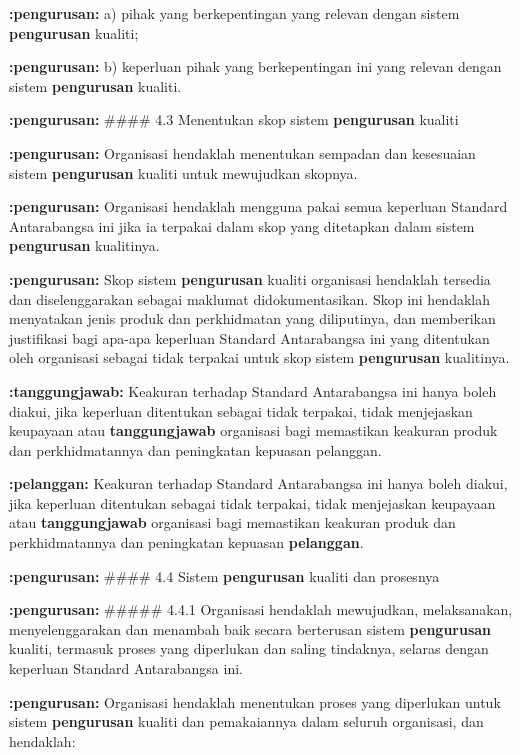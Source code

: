 \documentclass{article}
\begin{document}
\textbf{:pengurusan:} a) pihak yang berkepentingan yang relevan dengan sistem \textbf{pengurusan} kualiti;

\textbf{:pengurusan:} b) keperluan pihak yang berkepentingan ini yang relevan dengan sistem \textbf{pengurusan} kualiti.

\textbf{:pengurusan:} \#\#\#\# 4.3 Menentukan skop sistem \textbf{pengurusan} kualiti

\textbf{:pengurusan:} Organisasi hendaklah menentukan sempadan dan kesesuaian sistem \textbf{pengurusan} kualiti
untuk mewujudkan skopnya.

\textbf{:pengurusan:} Organisasi hendaklah mengguna pakai semua keperluan Standard Antarabangsa ini jika ia
terpakai dalam skop yang ditetapkan dalam sistem \textbf{pengurusan} kualitinya.

\textbf{:pengurusan:} Skop sistem \textbf{pengurusan} kualiti organisasi hendaklah tersedia dan diselenggarakan sebagai
maklumat didokumentasikan. Skop ini hendaklah menyatakan jenis produk dan perkhidmatan
yang diliputinya, dan memberikan justifikasi bagi apa-apa keperluan Standard Antarabangsa
ini yang ditentukan oleh organisasi sebagai tidak terpakai untuk skop sistem \textbf{pengurusan}
kualitinya.

\textbf{:tanggungjawab:} Keakuran terhadap Standard Antarabangsa ini hanya boleh diakui, jika keperluan ditentukan
sebagai tidak terpakai, tidak menjejaskan keupayaan atau \textbf{tanggungjawab} organisasi bagi
memastikan keakuran produk dan perkhidmatannya dan peningkatan kepuasan pelanggan.

\textbf{:pelanggan:} Keakuran terhadap Standard Antarabangsa ini hanya boleh diakui, jika keperluan ditentukan
sebagai tidak terpakai, tidak menjejaskan keupayaan atau \textbf{tanggungjawab} organisasi bagi
memastikan keakuran produk dan perkhidmatannya dan peningkatan kepuasan \textbf{pelanggan}.

\textbf{:pengurusan:} \#\#\#\# 4.4 Sistem \textbf{pengurusan} kualiti dan prosesnya

\textbf{:pengurusan:} \#\#\#\#\# 4.4.1 Organisasi hendaklah mewujudkan, melaksanakan, menyelenggarakan dan 
menambah baik secara berterusan sistem \textbf{pengurusan} kualiti, termasuk proses yang
diperlukan dan saling tindaknya, selaras dengan keperluan Standard Antarabangsa ini.

\textbf{:pengurusan:} Organisasi hendaklah menentukan proses yang diperlukan untuk sistem \textbf{pengurusan} kualiti
dan pemakaiannya dalam seluruh organisasi, dan hendaklah:
\end{document}
